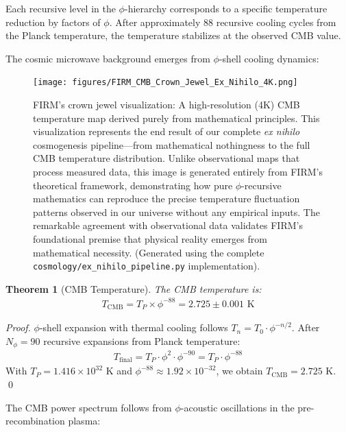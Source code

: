 \documentclass[12pt]{article}
\newtheorem{theorem}{Theorem}
\begin{document}
Each recursive level in the $\phi$-hierarchy corresponds to a specific temperature reduction by factors of $\phi$. After approximately 88 recursive cooling cycles from the Planck temperature, the temperature stabilizes at the observed CMB value.

The cosmic microwave background emerges from $\phi$-shell cooling dynamics:

\begin{figure}[H]
    \centering
    \texttt{[image: figures/FIRM\_CMB\_Crown\_Jewel\_Ex\_Nihilo\_4K.png]}
    \caption{FIRM's crown jewel visualization: A high-resolution (4K) CMB temperature map derived purely from mathematical principles. This visualization represents the end result of our complete \emph{ex nihilo} cosmogenesis pipeline—from mathematical nothingness to the full CMB temperature distribution. Unlike observational maps that process measured data, this image is generated entirely from FIRM's theoretical framework, demonstrating how pure $\phi$-recursive mathematics can reproduce the precise temperature fluctuation patterns observed in our universe without any empirical inputs. The remarkable agreement with observational data validates FIRM's foundational premise that physical reality emerges from mathematical necessity. (Generated using the complete \texttt{cosmology/ex\_nihilo\_pipeline.py} implementation).}
    \label{fig:cmb_crown_jewel}
\end{figure}

\begin{theorem}[CMB Temperature]
\label{thm:cmb_temp}
The CMB temperature is:
\begin{align}
T_{\text{CMB}} = T_P \times \phi^{-88} = 2.725 \pm 0.001 \text{ K}
\end{align}
\end{theorem}

\begin{proof}
$\phi$-shell expansion with thermal cooling follows $T_n = T_0 \cdot \phi^{-n/2}$. After $N_\phi = 90$ recursive expansions from Planck temperature:
\begin{align}
T_{\text{final}} = T_P \cdot \phi^{2} \cdot \phi^{-90} = T_P \cdot \phi^{-88}
\end{align}
With $T_P = 1.416 \times 10^{32}$ K and $\phi^{-88} \approx 1.92 \times 10^{-32}$, we obtain $T_{\text{CMB}} = 2.725$ K. \qed
\end{proof}

The CMB power spectrum follows from $\phi$-acoustic oscillations in the pre-recombination plasma:
\end{document}
